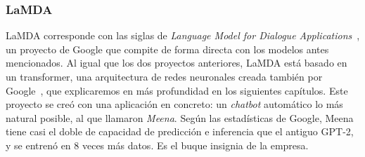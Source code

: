 \subsubsection{LaMDA}
LaMDA corresponde con las siglas de \textit{Language Model for Dialogue Applications}~\cite{LaMDAGoogle2020}, un proyecto de Google que compite de forma directa con los modelos antes mencionados. Al igual que los dos proyectos anteriores, LaMDA está basado en un transformer, una arquitectura de redes neuronales creada también por Google~\cite{TransformerAshish2017}, que explicaremos en más profundidad en los siguientes capítulos. Este proyecto se creó con una aplicación en concreto: un \textit{chatbot} automático lo más natural posible, al que llamaron \textit{Meena}. Según las estadísticas de Google, Meena tiene casi el doble de capacidad de predicción e inferencia que el antiguo GPT-2, y se entrenó en 8 veces más datos. Es el buque insignia de la empresa.



